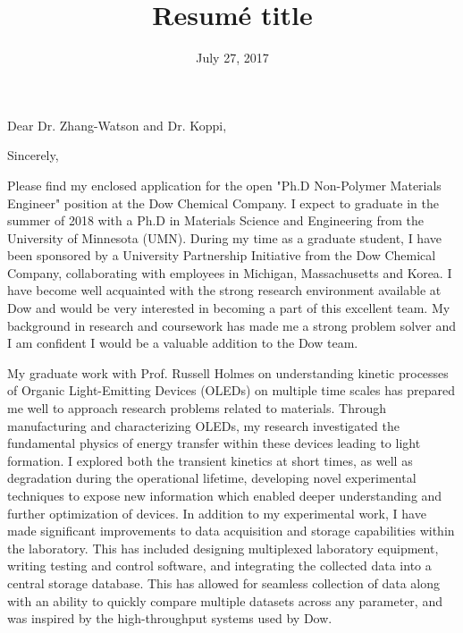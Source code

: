 \documentclass[11pt,a4paper]{moderncv}        %
\title{Resumé title}                               %
\begin{document}
\date{July 27, 2017}
\opening{Dear Dr. Zhang-Watson and Dr. Koppi,}
\closing{Sincerely,}
\makelettertitle
\justify
Please find my enclosed application for the open "Ph.D Non-Polymer Materials Engineer" position at the Dow Chemical Company.  I expect to graduate in the summer of 2018 with a  Ph.D in Materials Science and Engineering from the University of Minnesota (UMN).  During my time as a graduate student, I have been sponsored by a University Partnership Initiative from the Dow Chemical Company, collaborating with employees in Michigan, Massachusetts and Korea.  I have become well acquainted with the strong research environment available at Dow and would be very interested in becoming a part of this excellent team.  My background in research and coursework has made me a strong problem solver and I am confident I would be a valuable addition to the Dow team.

My graduate work with Prof. Russell Holmes on understanding kinetic processes of Organic Light-Emitting Devices (OLEDs) on multiple time scales has prepared me well to approach research problems related to materials.  Through manufacturing and characterizing OLEDs, my research investigated the fundamental physics of energy transfer within these devices leading to light formation.  I explored both the transient kinetics at short times, as well as degradation during the operational lifetime, developing novel experimental techniques to expose new information which enabled deeper understanding and further optimization of devices. In addition to my experimental work, I have made significant improvements to data acquisition and storage capabilities within the laboratory.  This has included designing multiplexed laboratory equipment, writing testing and control software, and integrating the collected data into a central storage database.  This has allowed for seamless collection of data along with an ability to quickly compare multiple datasets across any parameter, and was inspired by the high-throughput systems used by Dow.  
\end{document}
